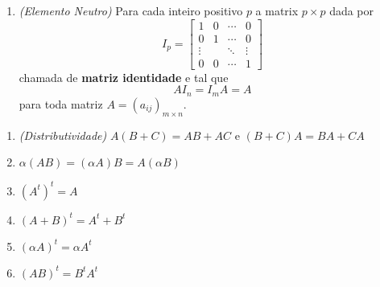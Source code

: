 \documentclass{beamer}
\begin{document}
  \begin{frame}
    \begin{teorema}
      \begin{enumerate}[label={\arabic*)}]
        \conti

        \item \textit{(Elemento Neutro)} Para cada inteiro positivo $p$ a matrix $p \times p$ dada por
          \[
            I_p = \begin{bmatrix}
              1 & 0 & \cdots & 0\\
              0 & 1 & \cdots & 0\\
              \vdots & & \ddots & \vdots\\
              0 & 0 & \cdots & 1
            \end{bmatrix}
          \]
        chamada de \textbf{matriz identidade} e tal que
        \[
          AI_n = I_mA = A
        \]
        para toda matriz $A = (a_{ij})_{m \times n}$.
      \seti
      \end{enumerate}
    \end{teorema}
  \end{frame}

  \begin{frame}
    \begin{teorema}
      \begin{enumerate}[label={\arabic*)}]
        \conti

        \item \textit{(Distributividade)} $A(B + C) = AB + AC$ e $(B + C)A = BA + CA$

        \item $\alpha(AB) = (\alpha A)B = A(\alpha B)$

        \item $(A^t)^t = A$

        \item $(A + B)^t = A^t + B^t$

        \item $(\alpha A)^t = \alpha A^t$

        \item $(AB)^t = B^tA^t$
      \end{enumerate}
    \end{teorema}
  \end{frame}
\end{document}
